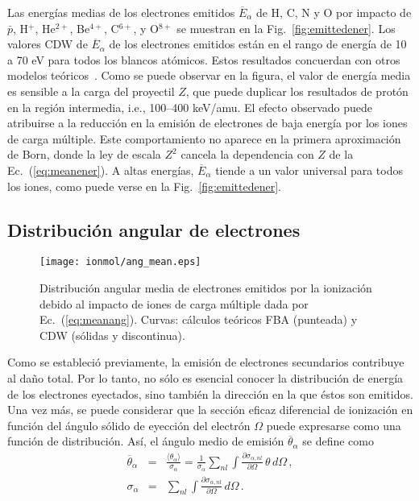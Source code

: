 Las energías medias de los electrones emitidos $\overline{E}_{\alpha}$ 
de H, C, N y O por impacto de $\bar{p}$, H$^{+}$, He$^{2+}$, Be$^{4+}$, 
C$^{6+}$, y O$^{8+}$ se muestran en la Fig.~\ref{fig:emittedener}. 
Los valores CDW de $\overline{E}_{\alpha}$ de los electrones emitidos 
están en el rango de energía de 10 a 70 eV para todos los blancos 
atómicos. Estos resultados concuerdan con otros modelos 
teóricos~\cite{Surdutovic:18}. Como se puede observar en la figura, el 
valor de energía media es sensible a la carga del proyectil $Z$, que 
puede duplicar los resultados de protón en la región intermedia, i.e., 
100--400 keV/amu. El efecto observado puede atribuirse a la reducción en 
la emisión de electrones de baja energía por los iones de carga múltiple. 
Este comportamiento no aparece en la primera aproximación de 
Born, donde la ley de escala $Z^2$ cancela la dependencia con $Z$ de la 
Ec.~(\ref{eq:meanener}). A altas energías, $\overline{E}_{\alpha}$ 
tiende a un valor universal para todos los iones, como puede verse en la 
Fig.~\ref{fig:emittedener}.

\subsection{Distribución angular de electrones}
\label{subsec:meanang}

\begin{figure}
\centering
\texttt{[image: ionmol/ang\_mean.eps]}
\caption[Distribución angular media de electrones emitidos.]
{Distribución angular media de electrones emitidos por la ionización 
debido al impacto de iones de carga múltiple dada por 
Ec.~(\ref{eq:meanang}). Curvas: cálculos teóricos FBA (punteada) y CDW 
(sólidas y discontinua).}
\label{fig:emittedang}
\end{figure} 

Como se estableció previamente, la emisión de electrones secundarios 
contribuye al daño total. Por lo tanto, no sólo es esencial conocer la 
distribución de energía de los electrones eyectados, sino también la 
dirección en la que éstos son emitidos. Una vez más, se puede considerar 
que la sección eficaz diferencial de ionización en función del ángulo 
sólido de eyección del electrón $\Omega$ puede expresarse como una 
función de distribución. Así, el ángulo medio de emisión 
$\overline{\theta}_{\alpha}$ se define como 
\begin{eqnarray}
\overline{\theta}_{\alpha}&=&\frac{\langle\theta_{\alpha}\rangle}
{\sigma_{\alpha}}=\frac{1}{\sigma_{\alpha}}\sum_{nl}
\int\frac{\partial\sigma_{\alpha,nl}}{\partial\Omega}\,\theta\,d\Omega\,,
\label{eq:meanang} \\
\sigma_{\alpha}&=&\sum_{nl}\int\frac{\partial\sigma_{\alpha,nl}}{
\partial\Omega}\,d\Omega\,.
\end{eqnarray}

